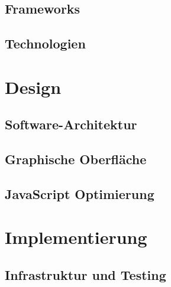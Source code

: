 \documentclass[12pt]{article}
\begin{document}
\subsection{Frameworks}
\label{subsec:frameworks}


\newpage

\subsection{Technologien}
\label{subsec:technologien}


\newpage %

\section{Design}
\label{sec:design}


\subsection{Software-Architektur}
\label{subsec:softwarearchitektur}


\newpage

\subsection{Graphische Oberfläche}
\label{subsec:graphischeoberflaeche}


\newpage

\subsection{JavaScript Optimierung}
\label{subsec:javascriptoptimierung}


\newpage %

\section{Implementierung}
\label{sec:implementierung}


\subsection{Infrastruktur und Testing}
\label{subsec:infrastrukturtesting}

\end{document}
